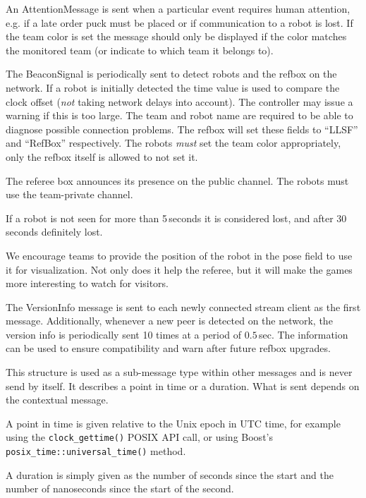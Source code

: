 \documentclass[a4paper]{article}
\begin{document}
%
{%
  An AttentionMessage is sent when a particular event requires human
  attention, e.g. if a late order puck must be placed or if
  communication to a robot is lost. If the team color is set the
  message should only be displayed if the color matches the monitored
  team (or indicate to which team it belongs to).
}

%
{%
  The BeaconSignal is periodically sent to detect robots and the
  refbox on the network. If a robot is initially detected the time
  value is used to compare the clock offset (\emph{not} taking network
  delays into account). The controller may issue a warning if this is
  too large. The team and robot name are required to be able to
  diagnose possible connection problems. The refbox will set these
  fields to ``LLSF'' and ``RefBox'' respectively. The robots
  \emph{must} set the team color appropriately, only the refbox itself
  is allowed to not set it.

  \smallskip

  The referee box announces its presence on the public channel. The
  robots must use the team-private channel.

  \smallskip

  If a robot is not seen for more than 5\,seconds it is considered
  lost, and after 30\,seconds definitely lost.

  \smallskip

  We encourage teams to provide the position of the robot in the pose
  field to use it for visualization. Not only does it help the
  referee, but it will make the games more interesting to watch for
  visitors.
}

%
{%
  The VersionInfo message is sent to each newly connected stream
  client as the first message. Additionally, whenever a new peer is
  detected on the network, the version info is periodically sent 10
  times at a period of $0.5$\,sec. The information can be used to
  ensure compatibility and warn after future refbox upgrades.
}

%
{%
  This structure is used as a sub-message type within other messages
  and is never send by itself. It describes a point in time or a
  duration. What is sent depends on the contextual message.

  \smallskip

  A point in time is given relative to the Unix epoch in UTC time, for
  example using the \texttt{clock\_gettime()} POSIX API call, or using
  Boost's \texttt{posix\_time::universal\_time()} method.

  A duration is simply given as the number of seconds since the start
  and the number of nanoseconds since the start of the second.
}
\end{document}
